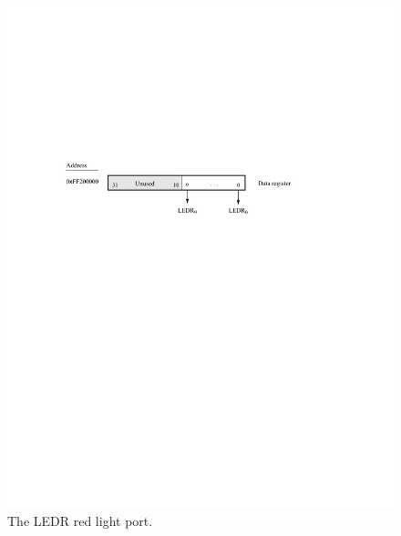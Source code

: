 \documentclass[epsfig,10pt,fullpage]{article}
\begin{document}
\begin{figure}[H]
   \begin{center}
       \includegraphics{figures/fig_LED_port.pdf}
   \end{center}
    \caption{The LEDR red light port.}
\label{fig:LEDR}

\end{figure}
\end{document}
